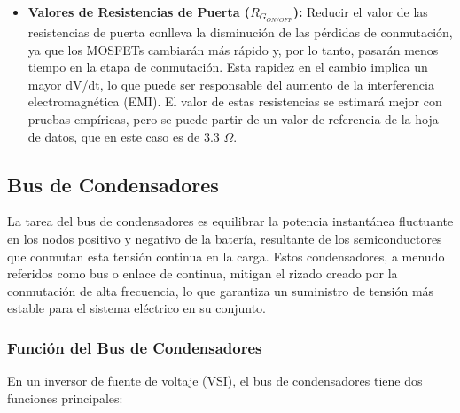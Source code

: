 \begin{itemize}
	\item \textbf{Valores de Resistencias de Puerta (\(R_{G_{ON/OFF}}\)):} Reducir el valor de las resistencias de puerta conlleva la disminución de las pérdidas de conmutación, ya que los MOSFETs cambiarán más rápido y, por lo tanto, pasarán menos tiempo en la etapa de conmutación. Esta rapidez en el cambio implica un mayor dV/dt, lo que puede ser responsable del aumento de la interferencia electromagnética (EMI). El valor de estas resistencias se estimará mejor con pruebas empíricas, pero se puede partir de un valor de referencia de la hoja de datos, que en este caso es de 3.3 $\Omega$.
	
\end{itemize}


\subsection{Bus de Condensadores}

La tarea del bus de condensadores es equilibrar la potencia instantánea fluctuante en los nodos positivo y negativo de la batería, resultante de los semiconductores que conmutan esta tensión continua en la carga. Estos condensadores, a menudo referidos como bus o enlace de continua, mitigan el rizado creado por la conmutación de alta frecuencia, lo que garantiza un suministro de tensión más estable para el sistema eléctrico en su conjunto.

\subsubsection{Función del Bus de Condensadores}

En un inversor de fuente de voltaje (VSI), el bus de condensadores tiene dos funciones principales:

